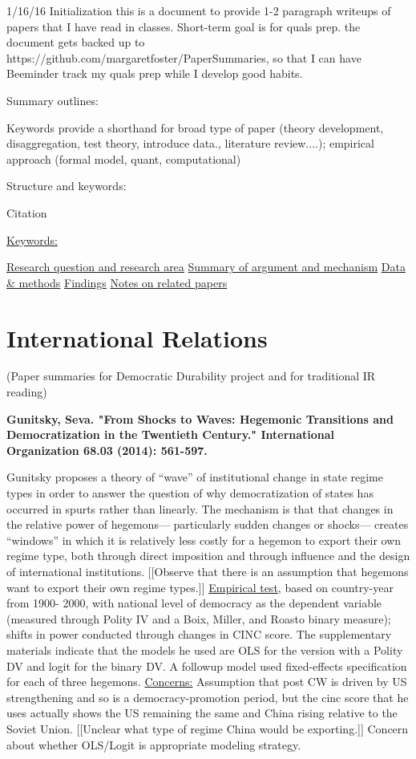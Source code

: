 \documentclass{article}[12pt]
\begin{document}
1/16/16 Initialization
this is a document to provide 1-2 paragraph writeups of papers that I have read in classes. Short-term goal is for quals prep.
the document gets backed up to https://github.com/margaretfoster/PaperSummaries, so that I can have Beeminder track my quals prep 
while I develop good habits.

Summary outlines:

Keywords provide a shorthand for broad type of paper (theory development, disaggregation, test theory, introduce data., literature review....); empirical approach (formal model, quant, computational)

Structure and keywords:

Citation

\underline{Keywords:}

\underline{Research question and research area}
\underline{Summary of argument and mechanism}
\underline{Data \& methods}
\underline{Findings}
\underline{Notes on related papers}

\section{International Relations}
(Paper summaries for Democratic Durability project and for traditional IR reading)


\textbf{Gunitsky, Seva. "From Shocks to Waves: Hegemonic Transitions and Democratization in the Twentieth Century." International Organization 68.03 (2014): 561-597.}

Gunitsky proposes a theory of “wave” of institutional change in state regime types in order to answer the question of why democratization of states has occurred in spurts rather than linearly. The mechanism is that that changes in the relative power of hegemons— particularly sudden changes or shocks— creates “windows” in which it is relatively less costly for a hegemon to export their own regime type, both through direct imposition and through influence and the design of international institutions. [[Observe that there is an assumption that hegemons want to export their own regime types.]]
\underline{Empirical test}, based on country-year from 1900- 2000, with national level of democracy as the dependent variable (measured through Polity IV and a Boix, Miller, and Roasto binary measure); shifts in power conducted through changes in CINC score. The supplementary materials indicate that the models he used are OLS for the version with a Polity DV and logit for the binary DV.  A followup model used fixed-effects specification for each of three hegemons.
\underline{Concerns:} Assumption that post CW is driven by US strengthening and so is a democracy-promotion period, but the cinc score that he uses actually shows the US remaining the same and China rising relative to the Soviet Union. [[Unclear what type of regime China would be exporting.]] Concern about whether OLS/Logit is appropriate modeling strategy.
\end{document}
